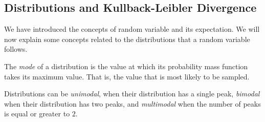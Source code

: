 \label{Chapter:distributions}


\subsection*{Distributions and Kullback-Leibler Divergence}

We have introduced the concepts of random variable and its expectation. We will now explain some concepts related to the distributions that a random variable follows.

\begin{ndefC}
    The \emph{mode} of a distribution is the value at which its probability mass function  takes its maximum value. That is, the value that is most likely to be sampled.
\end{ndefC}

Distributions can be \emph{unimodal}, when their distribution has a single peak, \emph{bimodal} when their distribution has two peaks, and \emph{multimodal} when the number of peaks is equal or greater to $2$. 

